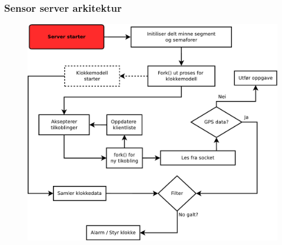 \documentclass[xcolor=table]{beamer}
\begin{document}
\begin{frame}
  \frametitle{Sensor server arkitektur}
    \begin{figure}
      \includegraphics[scale=0.25]{thesis/graphics/csac_core_simplified.pdf}
    \end{figure}
\end{frame}
\end{document}
